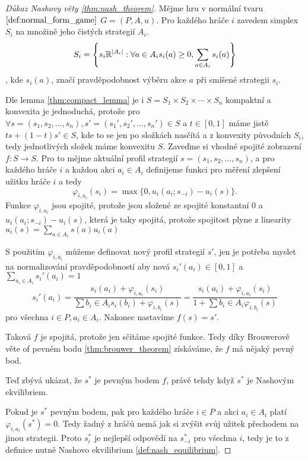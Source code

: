 \begin{proof}[Důkaz Nashovy věty \ref{thm:nash_theorem}]
Mějme hru v normální tvaru $\ref{def:normal_form_game}$ $G = (P, A, u)$. 
Pro každého hráče $i$ zavedem simplex $S_i$ na množině jeho čistých strategií $A_i$. 
\[
    S_i = \left\{ s_i \mathbb{R}^{\left|A_i\right|}: \forall a \in A_i s_i(a) \geq 0, \sum_{a \in A_i} s_i(a) \right\}
\],
kde $s_i(a)$, značí pravděpodobnost výběru akce $a$ při smíšené strategii $s_i$. 

Dle lemma \ref{thm:compact_lemma} je i $S = S_1 \times S_2 \times \cdots \times S_n$ kompaktní a konvexita je jednoduchá, protože pro $\forall s =(s_1, s_2, \dots, s_n), s' =(s_1', s_2', \dots, s_n') \in S$ a $t \in [0,1]$ máme jistě $ts + (1-t)s' \in S$, kde to se jen po složkách nasčítá a z konvexity původních $S_i$, tedy jednotlivých složek máme konvexitu $S$. 
Zaveďme si vhodné spojité zobrazení $f: S \rightarrow S$. 
Pro to mějme aktuální profil strategií $s =(s_1, s_2, \dots, s_n)$, a pro každého hráče $i$ a každou akci $a_i \in A_i$ definijeme funkci pro měření zlepšení užitku hráče $i$ a tedy 
\[
    \varphi_{i,a_i}(s_i) = \max\{0,u_i(a_i; s_{-i}) - u_i(s) \}.
\]
Funkce $\varphi_{i,a_i}$ jsou spojité, protože jsou složené ze spojité konstantní $0$ a $u_i(a_i;s_{-i}) - u_i(s)$, která je taky spojitá, protože spojitost plyne z linearity $u_i(s) = \sum_{a \in A_i} s(a) u_i(a)$

S použitím $\varphi_{i,a_i}$ můžeme definovat nový profil strategií $s'$, jen je potřeba myslet na normalizování pravděpodobností aby nová $s_i'(a_i) \in [0,1]$ a $\sum_{a_i \in A_i} s_i'(a_i) = 1$
\[
    s_i'(a_i) = \frac{s_i(a_i) + \varphi_{i,a_i}(s_i)}{\sum{b_i \in A_i} s_i(b_i) + \varphi_{i,b_i}(s)} = \frac{s_i(a_i) + \varphi_{i,a_i}(s_i)}{1 + \sum{b_i \in A_i} \varphi_{i,b_i}(s)}
\]
pro všechna $i \in P, a_i \in A_i$. Nakonec nastavíme $f(s) = s'$. 

Taková $f$ je spojitá, protože jen sčítáme spojité funkce. Tedy díky Brouwerově věte of pevném bodu \ref{thm:brouwer_theorem} získáváme, že $f$ má nějaký pevný bod. 

Teď zbývá ukázat, že $s^*$ je pevným bodem $f$, právě tehdy když $s^*$ je Nashovým ekvilibriem. 

Pokud je $s^*$ pevným bodem, pak pro každého hráče $i \in P$ a akci $a_i \in A_i$ platí $\varphi_{i,a_i}(s^*) = 0$. Tedy žadný z hráčů nemá jak si zvýšit svůj užitek přechodem na jinou strategii. 
Proto $s_i^{*}$ je nejlepší odpovědí na $s_{-i}^{*}$ pro všechna $i$, tedy je to z definice nutně Nashovo ekvilibrium \ref{def:nash_equilibrium}.
\end{proof}
